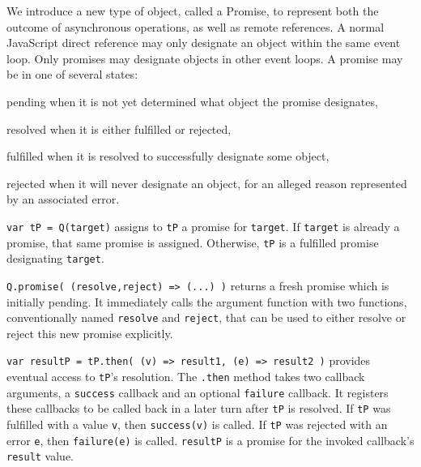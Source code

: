 \documentclass{llncs}
\begin{document}
We introduce a new type of object, called a Promise, to represent both the outcome of asynchronous operations, as well as remote references. A normal JavaScript direct reference may only designate an object within the same event loop. Only promises may designate objects in other event loops. A promise may be in one of several states:

\begin{description*}
  \item[pending] when it is not yet determined what object the promise designates,
  \item[resolved] when it is either fulfilled or rejected,
  \begin{description*}
    \item[fulfilled] when it is resolved to successfully designate some object,
    \item[rejected] when it will never designate an object, for an alleged reason represented by an associated error.
  \end{description*}
\end{description*}


\begin{description*}
\item[{\tt var tP = Q(target)}] assigns to {\tt tP} a promise for {\tt target}. If {\tt target} is already a promise, that same promise is assigned. Otherwise, {\tt tP} is a fulfilled promise designating {\tt target}.

\item[{\tt Q.promise( (resolve,reject) => (...) )}] returns a fresh promise which is initially pending. It immediately calls the argument function with two functions, conventionally named {\tt resolve} and {\tt reject}, that can be used to either resolve or reject this new promise explicitly. 

\item[{\tt var resultP = tP.then( (v) => result1, (e) => result2 )}] provides eventual access to {\tt tP}'s resolution. The {\tt .then} method takes two callback arguments, a \texttt{success} callback and an optional \texttt{failure} callback. It registers these callbacks to be called back in a later turn after {\tt tP} is resolved. If {\tt tP} was fulfilled with a value {\tt v}, then {\tt success(v)} is called. If {\tt tP} was rejected with an error {\tt e}, then {\tt failure(e)} is called. {\tt resultP} is a promise for the invoked callback's {\tt result} value. 
\end{description*}
\end{document}
